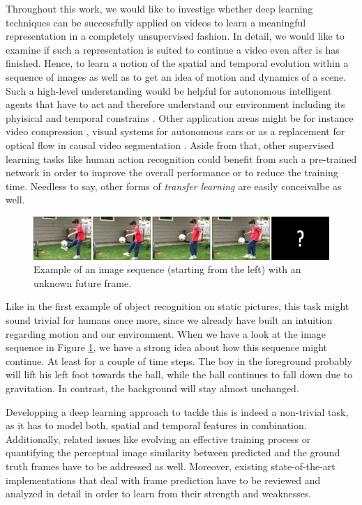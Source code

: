 Throughout this work, we would like to investige whether deep learning techniques can be successfully applied on videos to learn a meaningful representation in a completely unsupervised fashion. In detail, we would like to examine if such a representation is suited to continue a video even after is has finished. Hence, to learn a notion of the spatial and temporal evolution within a sequence of images as well as to get an idea of motion and dynamics of a scene. Such a high-level understanding would be helpful for autonomous intelligent agents that have to act and therefore understand our environment including its phyisical and temporal constrains \parencite{unsup_learn_lstm}. Other application areas might be for instance video compression \parencite{frame_interpol}, visual systems for autonomous cars or as a replacement for optical flow in causal video segmentation \parencite{causal_video_seg}. Aside from that, other supervised learning tasks like human action recognition could benefit from such a pre-trained network in order to improve the overall performance or to reduce the training time. Needless to say, other forms of \textit{transfer learning} are easily conceivalbe as well.

\begin{figure}[htpb]
	\centering
	\includegraphics[width=1.0\linewidth]{figures/ucf-intro/serie1.png} 
	\caption[Example Image Sequence]{Example of an image sequence (starting from the left) with an unknown future frame.} \label{fig:intro-seq}
\end{figure}

Like in the first example of object recognition on static pictures, this task might sound trivial for humans once more, since we already have built an intuition regarding motion and our environment. When we have a look at the image sequence in Figure \ref{fig:intro-seq}, we have a strong idea about how this sequence might continue. At least for a couple of time steps. The boy in the foreground probably will lift his left foot towards the ball, while the ball continues to fall down due to gravitation. In contrast, the background will stay almost unchanged.

Developping a deep learning approach to tackle this is indeed a non-trivial task, as it has to model both, spatial and temporal features in combination. Additionally, related issues like evolving an effective training process or quantifying the perceptual image similarity between predicted and the ground truth frames have to be addressed as well. Moreover, existing state-of-the-art implementations that deal with frame prediction have to be reviewed and analyzed in detail in order to learn from their strength and weaknesses.


